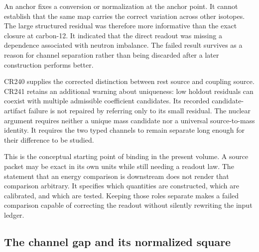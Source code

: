 An anchor fixes a conversion or normalization at the anchor point. It cannot establish that the same map carries the correct variation across other isotopes. The large structured residual was therefore more informative than the exact closure at carbon-12. It indicated that the direct readout was missing a dependence associated with neutron imbalance. The failed result survives as a reason for channel separation rather than being discarded after a later construction performs better.

CR240 supplies the corrected distinction between rest source and coupling source. CR241 retains an additional warning about uniqueness: low holdout residuals can coexist with multiple admissible coefficient candidates. Its recorded candidate-artifact failure is not repaired by referring only to its small residual. The nuclear argument requires neither a unique mass candidate nor a universal source-to-mass identity. It requires the two typed channels to remain separate long enough for their difference to be studied.

This is the conceptual starting point of binding in the present volume. A source packet may be exact in its own units while still needing a readout law. The statement that an energy comparison is downstream does not render that comparison arbitrary. It specifies which quantities are constructed, which are calibrated, and which are tested. Keeping those roles separate makes a failed comparison capable of correcting the readout without silently rewriting the input ledger.

\subsection{The channel gap and its normalized square}
\label{v2c5:exact}

